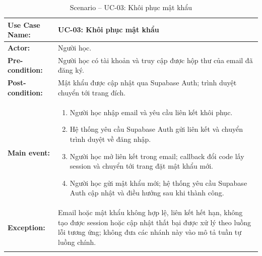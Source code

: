 \documentclass[12pt,a4paper,oneside]{report}
\newenvironment{luongusecase}{%
    \begin{enumerate}[leftmargin=1.6em,topsep=0pt,itemsep=0.25em,parsep=0pt]
}{\end{enumerate}}
\begin{document}
\begingroup
\renewcommand{\arraystretch}{1.15}
\setlength{\LTpre}{0.4em}
\setlength{\LTpost}{0.6em}
\begin{longtable}{|>{\raggedright\arraybackslash\bfseries}p{}|p{}|}
\hline
Use Case Name: & UC-03: Khôi phục mật khẩu \\
\hline
Actor: & Người học. \\
\hline
Pre-condition: & Người học có tài khoản và truy cập được hộp thư của email đã đăng ký. \\
\hline
Post-condition: & Mật khẩu được cập nhật qua Supabase Auth; trình duyệt chuyển tới trang đích. \\
\hline
Main event: & \begin{luongusecase}
    \item Người học nhập email và yêu cầu liên kết khôi phục.
    \item Hệ thống yêu cầu Supabase Auth gửi liên kết và chuyển trình duyệt về đăng nhập.
    \item Người học mở liên kết trong email; callback đổi code lấy session và chuyển tới trang đặt mật khẩu mới.
    \item Người học gửi mật khẩu mới; hệ thống yêu cầu Supabase Auth cập nhật và điều hướng sau khi thành công.
\end{luongusecase} \\
\hline
Exception: & Email hoặc mật khẩu không hợp lệ, liên kết hết hạn, không tạo được session hoặc cập nhật thất bại được xử lý theo luồng lỗi tương ứng; không đưa các nhánh này vào mô tả tuần tự luồng chính. \\
\hline
\caption{Scenario -- UC-03: Khôi phục mật khẩu}\label{tab:uc-03}\\
\end{longtable}
\endgroup
\end{document}
